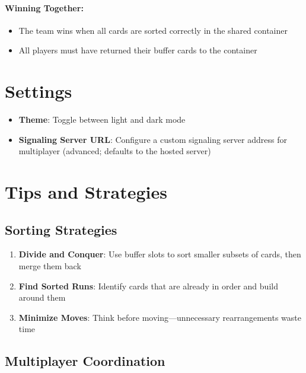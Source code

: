 \paragraph*{Winning Together:}
\begin{itemize}
    \item The team wins when all cards are sorted correctly in the shared container
    \item All players must have returned their buffer cards to the container
\end{itemize}

\section{Settings}
\label{app:a:settings}

\begin{itemize}
    \item \textbf{Theme}: Toggle between light and dark mode
    \item \textbf{Signaling Server URL}: Configure a custom signaling server address for multiplayer (advanced; defaults to the hosted server)
\end{itemize}

\section{Tips and Strategies}
\label{app:a:tips-strategies}

\subsection{Sorting Strategies}

\begin{enumerate}
    \item \textbf{Divide and Conquer}: Use buffer slots to sort smaller subsets of cards, then merge them back
    \item \textbf{Find Sorted Runs}: Identify cards that are already in order and build around them
    \item \textbf{Minimize Moves}: Think before moving---unnecessary rearrangements waste time
\end{enumerate}

\subsection{Multiplayer Coordination}


